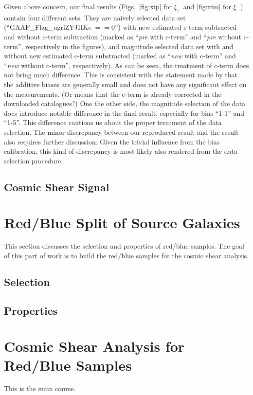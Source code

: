 \documentclass[fleqn,usenatbib]{mnras}
\newcommand{\R}{\color{red}}
\begin{document}
Given above concern, our final results (Figs.~\ref{fig:xip} for $\xi_+$ and \ref{fig:xim} for $\xi_-$) contain four different sets. They are naively selected data set (``GAAP\_Flag\_ugriZYJHKs $==0$'') with new estimated c-term subtracted and without c-term subtraction (marked as ``{\it pre} with c-term'' and ``{\it pre} without c-term'', respectively in the figures), and magnitude selected data set with and without new estimated c-term substracted (marked as ``{\it new} with c-term'' and ``{\it new} without c-term'', respectively). As can be seen, the treatment of c-term does not bring much difference. This is consistent with the statement made by \citet{2018arXiv181206076H} that the additive biases are generally small and does not have any significant effect on the measurements. ({\R Or means that the c-term is already corrected in the downloaded catalogues?}) One the other side, the magnitude selection of the data does introduce notable difference in the final result, especially for bins ``1-1'' and ``1-5''. This difference cautions us about the proper treatment of the data selection. The minor discrepancy between our reproduced result and the \citet{2018arXiv181206076H} result also requires further discussion. Given the trivial influence from the bias calibration, this kind of discrepancy is most likely also rendered from the data selection procedure.

\subsection{Cosmic Shear Signal}

\section{Red/Blue Split of Source Galaxies}
This section discusses the selection and properties of red/blue samples. The goal of this part of work is to build the red/blue samples for the cosmic shear analysis.

\subsection{Selection}

\subsection{Properties}

\section{Cosmic Shear Analysis for Red/Blue Samples}
This is the main course.
\end{document}
